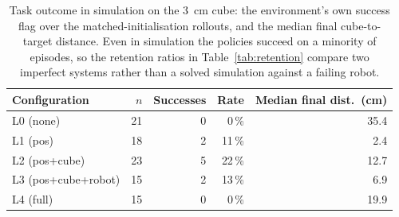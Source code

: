 \begin{table}[h]
\centering
\caption{Task outcome in simulation on the 3~cm cube: the environment's own success flag over the matched-initialisation rollouts, and the median final cube-to-target distance. Even in simulation the policies succeed on a minority of episodes, so the retention ratios in Table~\ref{tab:retention} compare two imperfect systems rather than a solved simulation against a failing robot.}
\label{tab:sim_success}
\begin{tabular}{lrrrr}
\hline
\textbf{Configuration} & \textbf{$n$} & \textbf{Successes} & \textbf{Rate} & \textbf{Median final dist.\ (cm)} \\
\hline
L0 (none) & 21 & 0 & 0\,\% & 35.4 \\
L1 (pos) & 18 & 2 & 11\,\% & 2.4 \\
L2 (pos+cube) & 23 & 5 & 22\,\% & 12.7 \\
L3 (pos+cube+robot) & 15 & 2 & 13\,\% & 6.9 \\
L4 (full) & 15 & 0 & 0\,\% & 19.9 \\
\hline
\end{tabular}
\end{table}
